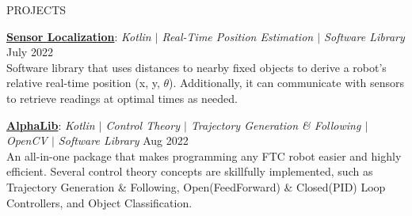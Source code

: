 \documentclass{resume} %
\begin{document}
\begin{rSection}{PROJECTS}
        \item \underline{\textbf{Sensor Localization}}: \textit{Kotlin $\vert$ Real-Time Position Estimation $\vert$ Software Library} \hfill {July 2022} \vspace{0.25em}\\
        {Software library that uses distances to nearby fixed objects to derive a robot's relative real-time position (x, y, $\theta$). Additionally, it can communicate with sensors to retrieve readings at optimal times as needed.}

        \item \underline{\textbf{AlphaLib}}: \textit{Kotlin $\vert$ Control Theory $\vert$ Trajectory Generation \& Following $\vert$ OpenCV $\vert$ Software Library} \hfill {Aug 2022} \vspace{0.25em}\\
        {An all-in-one package that makes programming any FTC robot easier and highly efficient. Several control theory concepts are skillfully implemented, such as Trajectory Generation \& Following, Open(FeedForward) \& Closed(PID) Loop Controllers, and Object Classification.}
    \end{rSection} 
\end{document}
